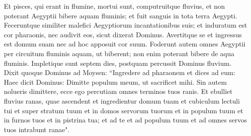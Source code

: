 \begin{biblechapter}
\verse Et pisces, qui erant in flumine, mortui sunt, computruitque fluvius, et non poterant Aegyptii bibere aquam fluminis; et fuit sanguis in tota terra Aegypti. 
\verse Feceruntque similiter malefici Aegyptiorum incantationibus suis; et induratum est cor pharaonis, nec audivit eos, sicut dixerat Dominus. 
\verse Avertitque se et ingressus est domum suam nec ad hoc apposuit cor suum. 
\verse Foderunt autem omnes Aegyptii per circuitum fluminis aquam, ut biberent; non enim poterant bibere de aqua fluminis. 
\verse Impletique sunt septem dies, postquam percussit Dominus fluvium. 
\verse Dixit quoque Dominus ad Moysen: “Ingredere ad pharaonem et dices ad eum: Haec dicit Dominus: Dimitte populum meum, ut sacrificet mihi. 
\verse Sin autem nolueris dimittere, ecce ego percutiam omnes terminos tuos ranis. 
\verse Et ebulliet fluvius ranas, quae ascendent et ingredientur domum tuam et cubiculum lectuli tui et super stratum tuum et in domos servorum tuorum et in populum tuum et in furnos tuos et in pistrina tua; 
\verse et ad te et ad populum tuum et ad omnes servos tuos intrabunt ranae". 
\end{biblechapter}

